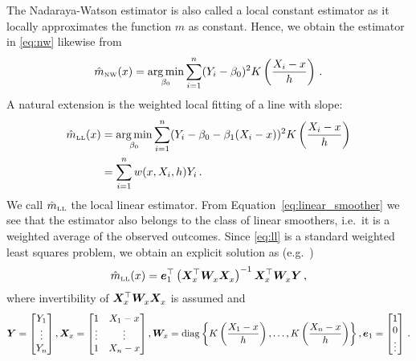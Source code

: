 The Nadaraya-Watson estimator is also called a local constant estimator as it locally approximates the function $m$ as constant.
Hence, we obtain the estimator in \eqref{eq:nw} likewise from
\begin{equation}
	\hat{m}_{\textup{\tiny NW}}(x) = \operatorname*{arg\,min}_{\beta_0} \sum_{i = 1}^{n} (Y_i - \beta_0)^2 K \left( \frac{X_i - x}{h} \right) \,.
\end{equation}
A natural extension is the weighted local fitting of a line with slope:
\begin{align}
	\hat{m}_{\textup{\tiny LL}}(x) &= \operatorname*{arg\,min}_{\beta_0} \sum_{i = 1}^{n} (Y_i - \beta_0 - \beta_1(X_i - x))^2 K \left( \frac{X_i - x}{h} \right) \label{eq:ll} \\ 
	&= \sum_{i = 1}^{n} w(x, X_i, h) Y_i \,. \label{eq:linear_smoother}
\end{align}
We call $\hat{m}_{\textup{\tiny LL}}$ the local linear estimator.
From Equation~\eqref{eq:linear_smoother} we see that the estimator also belongs to the class of linear smoothers, i.e.\
it is a weighted average of the observed outcomes.
Since \eqref{eq:ll} is a standard weighted least squares problem, we obtain an explicit solution as (e.g.\ \cite[Section~5.2]{Wand_1995})
\begin{equation}
	\hat{m}_{\textup{\tiny LL}}(x) = \bm{e}_1^\top \left( \bm{X}_x^\top \bm{W}_x^{\vphantom{\top}} \bm{X}_x^{\vphantom{\top}} \right)^{-1} \bm{X}_x^\top \bm{W}_x^{\vphantom{\top}} \bm{Y} \,, 
\end{equation}
where invertibility of $\bm{X}_x^\top \bm{W}_x^{\vphantom{\top}} \bm{X}_x^{\vphantom{\top}}$ is assumed and 
\begin{equation}
	\bm{Y} = \begin{bmatrix} Y_1 \\ \vdots \\ Y_n \end{bmatrix},
	\bm{X}_x = \begin{bmatrix} 1 & X_1 - x \\ \vdots & \vdots \\ 1 & X_n - x  \end{bmatrix},
	\bm{W}_x = \operatorname{diag} \left\{ K \left( \frac{X_1 - x}{h} \right), \dots, K \left( \frac{X_n - x}{h} \right) \right\},
	\bm{e}_1 = \begin{bmatrix} 1 \\ 0 \\ \vdots \end{bmatrix} \,.
\end{equation}

